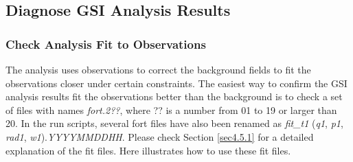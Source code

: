 \subsection{Diagnose GSI Analysis Results}

\subsubsection{Check Analysis Fit to Observations}

The analysis uses observations to correct the background fields to fit the observations closer under certain constraints.  The easiest way to confirm the GSI analysis results fit the observations better than the background is to check a set of files with names \textit{fort.2??}, where ?? is a number from 01 to 19 or larger than 20.  In the run scripts, several fort files have also been renamed as \textit{fit\_t1} (\textit{q1}, \textit{p1}, \textit{rad1}, \textit{w1}).\textit{YYYYMMDDHH}.  Please check Section \ref{sec4.5.1} for a detailed explanation of the fit files. Here illustrates how to use these fit files. 

